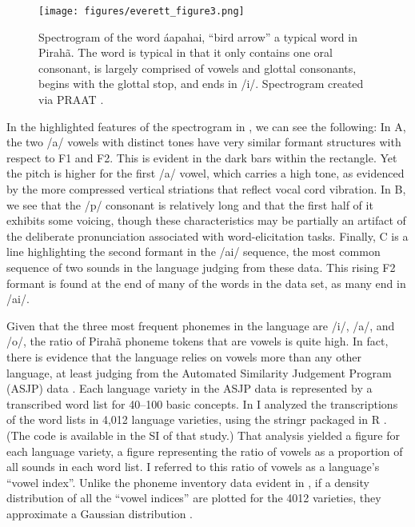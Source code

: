 \documentclass[output=paper,colorlinks,citecolor=brown
]{langscibook}
\begin{document}
\begin{figure}
\texttt{[image: figures/everett\_figure3.png]}
\caption{\label{everett-figure-3}Spectrogram of the word {\textglotstop}áapahai, “bird arrow” a typical word in Pirahã. The word is typical in that it only contains one oral consonant, is largely comprised of vowels and glottal consonants, begins with the glottal stop, and ends in /i/. Spectrogram created via PRAAT \citep{boersma2018praat}.}
\end{figure}

    In the highlighted features of the spectrogram in , we can see the following: In A, the two /a/ vowels with distinct tones have very similar formant structures with respect to F1 and F2. This is evident in the dark bars within the rectangle. Yet the pitch is higher for the first /a/ vowel, which carries a high tone, as evidenced by the more compressed vertical striations that reflect vocal cord vibration. In B, we see that the /p/ consonant is relatively long and that the first half of it exhibits some voicing, though these characteristics may be partially an artifact of the deliberate pronunciation associated with word-elicitation tasks. Finally, C is a line highlighting the second formant in the /ai/ sequence, the most common sequence of two sounds in the language judging from these data. This rising F2 formant is found at the end of many of the words in the data set, as many end in /ai/.

    Given that the three most frequent phonemes in the language are /i/, /a/, and /o/, the ratio of Pirahã phoneme tokens that are vowels is quite high. In fact, there is evidence that the language relies on vowels more than any other language, at least judging from the Automated Similarity Judgement Program (ASJP) data \citep{wichmann2016asjp}. Each language variety in the ASJP data is represented by a transcribed word list for 40--100 basic concepts. In  I analyzed the transcriptions of the word lists in 4,012 language varieties, using the stringr packaged in R \citep{wickham2019package}. (The code is available in the SI of that study.) That analysis yielded a figure for each language variety, a figure representing the ratio of vowels as a proportion of all sounds in each word list. I referred to this ratio of vowels as a language’s “vowel index”. Unlike the phoneme inventory data evident in , if a density distribution of all the “vowel indices” are plotted for the 4012 varieties, they approximate a Gaussian distribution \citep{everett2017languages}. 
\end{document}
